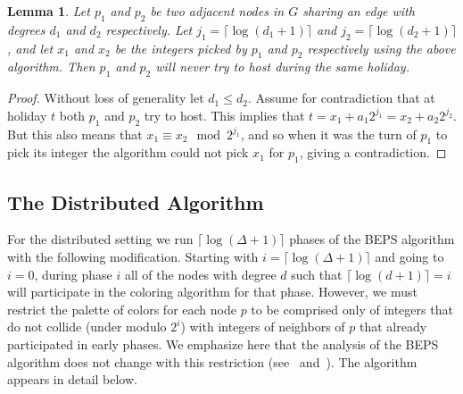 \documentclass[11pt]{article}
\newtheorem{lemma}[theorem]{Lemma}
\begin{document}
\begin{lemma}\label{lemma:sequential_degree_bound}
Let $p_1$ and $p_2$ be two adjacent nodes in $G$ sharing an edge with degrees $d_1$ and $d_2$ respectively. Let $j_1=\lceil \log (d_1+1) \rceil$ and $j_2=\lceil \log (d_2+1) \rceil$, and let $x_1$ and $x_2$ be the integers picked by $p_1$ and $p_2$ respectively using the above algorithm. Then $p_1$ and $p_2$ will never try to host during the same holiday.
\end{lemma}
\begin{proof}

Without loss of generality let $d_1 \leq d_2$. Assume for contradiction that at holiday $t$ both $p_1$ and $p_2$ try to host. This implies that $t=x_1 + a_1 2^{j_1} = x_2 + a_2 2^{j_2}$. But this also means that $x_1 \equiv x_2 \mod 2^{j_1}$, and so when it was the turn of $p_1$ to pick its integer the algorithm could not pick $x_1$ for $p_1$, giving a contradiction.
\end{proof}


\subsection{The Distributed Algorithm}
For the distributed setting we run $\lceil\log (\Delta+1)\rceil$ phases of the BEPS algorithm with the following modification. Starting with $i= \lceil\log (\Delta+1)\rceil$ and going to $i = 0$, during phase $i$ all of the nodes with degree $d$ such that $\lceil \log (d+1) \rceil = i$ will participate in the coloring algorithm for that phase. However, we must restrict the palette of colors for each node $p$ to be comprised only of integers that do not collide (under modulo $2^{i}$) with integers of neighbors of $p$ that already participated in early phases. We emphasize here that the analysis of the BEPS algorithm does not change with this restriction (see~\cite{BEPS12} and~\cite{Johansson99}). The algorithm appears in detail below.


\end{document}
